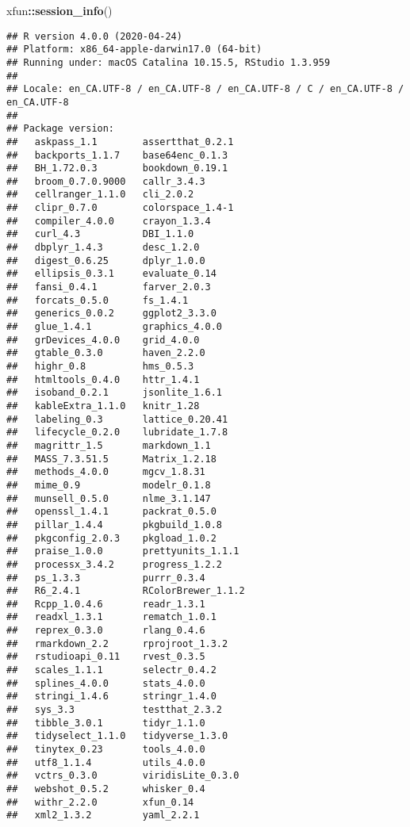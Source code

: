\documentclass[
]{krantz}
\makeatletter
\newenvironment{Shaded}{\begin{snugshade}}{\end{snugshade}}
\newcommand{\KeywordTok}[1]{\textcolor[rgb]{0.27,0.27,0.27}{\textbf{#1}}}
\newcommand{\NormalTok}[1]{#1}
\newcommand{\OperatorTok}[1]{\textcolor[rgb]{0.43,0.43,0.43}{\textbf{#1}}}
\newenvironment{kframe}{%
\medskip{}
\setlength{\fboxsep}{.8em}
 \def\at@end@of@kframe{}%
 \ifinner\ifhmode%
  \def\at@end@of@kframe{\end{minipage}}%
  \begin{minipage}{\columnwidth}%
 \fi\fi%
 \def\FrameCommand##1{\hskip\@totalleftmargin \hskip-\fboxsep
 \colorbox{shadecolor}{##1}\hskip-\fboxsep
     \hskip-\linewidth \hskip-\@totalleftmargin \hskip\columnwidth}%
 \MakeFramed {\advance\hsize-\width
   \@totalleftmargin\z@ \linewidth\hsize
   \@setminipage}}%
 {\par\unskip\endMakeFramed%
 \at@end@of@kframe}
\renewenvironment{Shaded}{\begin{kframe}}{\end{kframe}}
\makeatother
\begin{document}
\begin{Shaded}
\begin{Highlighting}[]
\NormalTok{xfun}\OperatorTok{::}\KeywordTok{session_info}\NormalTok{()}
\end{Highlighting}
\end{Shaded}

\begin{verbatim}
## R version 4.0.0 (2020-04-24)
## Platform: x86_64-apple-darwin17.0 (64-bit)
## Running under: macOS Catalina 10.15.5, RStudio 1.3.959
## 
## Locale: en_CA.UTF-8 / en_CA.UTF-8 / en_CA.UTF-8 / C / en_CA.UTF-8 / en_CA.UTF-8
## 
## Package version:
##   askpass_1.1        assertthat_0.2.1  
##   backports_1.1.7    base64enc_0.1.3   
##   BH_1.72.0.3        bookdown_0.19.1   
##   broom_0.7.0.9000   callr_3.4.3       
##   cellranger_1.1.0   cli_2.0.2         
##   clipr_0.7.0        colorspace_1.4-1  
##   compiler_4.0.0     crayon_1.3.4      
##   curl_4.3           DBI_1.1.0         
##   dbplyr_1.4.3       desc_1.2.0        
##   digest_0.6.25      dplyr_1.0.0       
##   ellipsis_0.3.1     evaluate_0.14     
##   fansi_0.4.1        farver_2.0.3      
##   forcats_0.5.0      fs_1.4.1          
##   generics_0.0.2     ggplot2_3.3.0     
##   glue_1.4.1         graphics_4.0.0    
##   grDevices_4.0.0    grid_4.0.0        
##   gtable_0.3.0       haven_2.2.0       
##   highr_0.8          hms_0.5.3         
##   htmltools_0.4.0    httr_1.4.1        
##   isoband_0.2.1      jsonlite_1.6.1    
##   kableExtra_1.1.0   knitr_1.28        
##   labeling_0.3       lattice_0.20.41   
##   lifecycle_0.2.0    lubridate_1.7.8   
##   magrittr_1.5       markdown_1.1      
##   MASS_7.3.51.5      Matrix_1.2.18     
##   methods_4.0.0      mgcv_1.8.31       
##   mime_0.9           modelr_0.1.8      
##   munsell_0.5.0      nlme_3.1.147      
##   openssl_1.4.1      packrat_0.5.0     
##   pillar_1.4.4       pkgbuild_1.0.8    
##   pkgconfig_2.0.3    pkgload_1.0.2     
##   praise_1.0.0       prettyunits_1.1.1 
##   processx_3.4.2     progress_1.2.2    
##   ps_1.3.3           purrr_0.3.4       
##   R6_2.4.1           RColorBrewer_1.1.2
##   Rcpp_1.0.4.6       readr_1.3.1       
##   readxl_1.3.1       rematch_1.0.1     
##   reprex_0.3.0       rlang_0.4.6       
##   rmarkdown_2.2      rprojroot_1.3.2   
##   rstudioapi_0.11    rvest_0.3.5       
##   scales_1.1.1       selectr_0.4.2     
##   splines_4.0.0      stats_4.0.0       
##   stringi_1.4.6      stringr_1.4.0     
##   sys_3.3            testthat_2.3.2    
##   tibble_3.0.1       tidyr_1.1.0       
##   tidyselect_1.1.0   tidyverse_1.3.0   
##   tinytex_0.23       tools_4.0.0       
##   utf8_1.1.4         utils_4.0.0       
##   vctrs_0.3.0        viridisLite_0.3.0 
##   webshot_0.5.2      whisker_0.4       
##   withr_2.2.0        xfun_0.14         
##   xml2_1.3.2         yaml_2.2.1
\end{verbatim}
\end{document}

